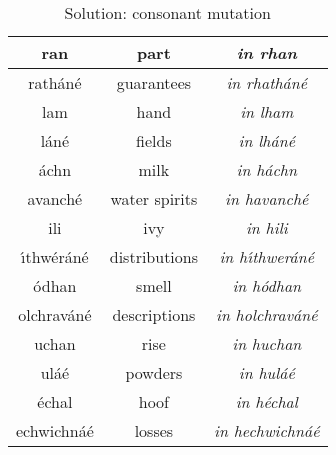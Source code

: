 \begin{table}[H]
{{\begin{tabular}{|c|c|>{\itshape}c|}
      \midrule
      ran & part & in rhan\\
      \midrule
      rath\'{a}n\'{e} & guarantees & in rhath\'{a}n\'{e}\\
      \midrule
      lam & hand & in lham\\
      \midrule
      l\'{a}n\'{e} & fields & in lh\'{a}n\'{e}\\
      \midrule
      \'{a}chn & milk & in h\'{a}chn\\
      \midrule
      avanch\'{e} & water spirits & in havanch\'{e}\\
      \midrule
      ili & ivy & in hili\\
      \midrule
      \'{\i}thw\'{e}r\'{a}n\'{e} & distributions & in h\'{\i}thwer\'{a}n\'{e}\\
      \midrule
      \'{o}dhan & smell & in h\'{o}dhan\\
      \midrule
      olchrav\'{a}n\'{e} & descriptions & in holchrav\'{a}n\'{e}\\
      \midrule
      uchan & rise & in huchan\\
      \midrule
      ul\'{a}\'{e} & powders & in hul\'{a}\'{e}\\
      \midrule
      \'{e}chal & hoof & in h\'{e}chal\\
      \midrule
      echwichn\'{a}\'{e} & losses & in hechwichn\'{a}\'{e}\\
      \bottomrule
    \end{tabular}
  }
}
\label{solution_consonant_mutation}
\caption{Solution: consonant mutation}
\end{table}
